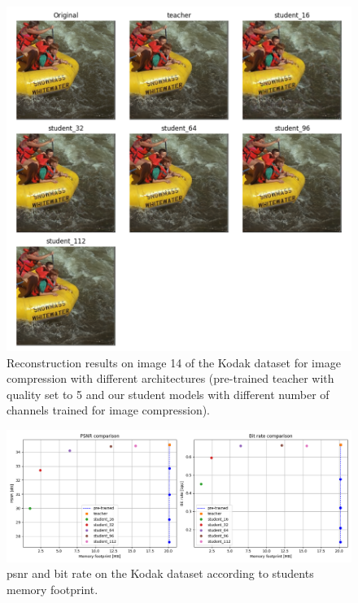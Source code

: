 \documentclass{article}
\begin{document}
\begin{figure}
  \centering
  \includegraphics[width=15cm]{../img/kd_lic_kodak_14.png}
  \caption[Reconstruction results on image 14 of the Kodak dataset for image compression with different architectures.]{Reconstruction results on image 14 of the Kodak dataset for image compression with different architectures (pre-trained teacher with \textsf{quality} set to 5 and our student models with different number of channels trained for image compression).}
  \label{appendix:kd_lic_2:a}
\end{figure}

\begin{figure}
  \centering
  \includegraphics[width=15cm]{../img/kd_lic_memory.png}
  \caption[\acrshort{psnr} and bit rate on the Kodak dataset according to students memory footprint.]{\acrshort{psnr} and bit rate on the Kodak dataset according to students memory footprint.}
  \label{appendix:kd_lic_memory}
\end{figure}
\end{document}
